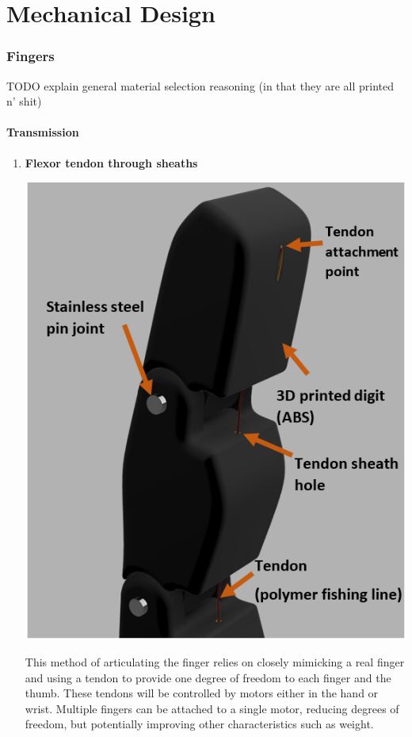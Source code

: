 \documentclass[12pt,3p]{report}
\begin{document}
\part{Mechanical Design}
\begin{multicols}{2}

	\section{Fingers}
TODO explain general material selection reasoning (in that they are all printed n' shit)
	
	
		\subsection{Transmission}
		
		
			\begin{enumerate}
			\item \textbf{Flexor tendon through sheaths} {

\includegraphics[scale=0.5]{tendon.PNG}
			
				This method of articulating the finger relies on closely mimicking a real finger and using a tendon to provide one degree of freedom to each finger and the thumb. These tendons will be controlled by motors either in the hand or wrist. Multiple fingers can be attached to a single motor, reducing degrees of freedom, but potentially improving other characteristics such as weight.
				
}
\end{enumerate}
\end{multicols}
\end{document}
